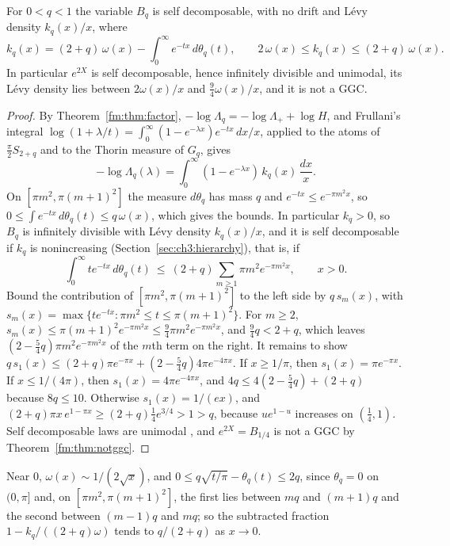 \begin{theorem}\label{fm:thm:sd}
For $0<q<1$ the variable $B_q$ is self decomposable, with no drift and L\'evy density $k_q(x)/x$, where
\[
k_q(x)=(2+q)\,\omega(x)-\int_0^\infty e^{-tx}\,d\theta_q(t),\qquad 2\,\omega(x)\le k_q(x)\le(2+q)\,\omega(x).
\]
In particular $e^{2X}$ is self decomposable, hence infinitely divisible and unimodal, its L\'evy density lies between $2\omega(x)/x$ and $\frac94\omega(x)/x$, and it is not a GGC.
\end{theorem}

\begin{proof}
By Theorem~\ref{fm:thm:factor}, $-\log\Lambda_q=-\log\Lambda_++\log H$, and Frullani's integral $\log(1+\lambda/t)=\int_0^\infty(1-e^{-\lambda x})e^{-tx}\,dx/x$, applied to the atoms of $\frac\pi2S_{2+q}$ and to the Thorin measure of $G_q$, gives
\[
-\log\Lambda_q(\lambda)=\int_0^\infty(1-e^{-\lambda x})\,k_q(x)\,\frac{dx}x .
\]
On $[\pi m^2,\pi(m+1)^2]$ the measure $d\theta_q$ has mass $q$ and $e^{-tx}\le e^{-\pi m^2x}$, so $0\le\int e^{-tx}\,d\theta_q(t)\le q\,\omega(x)$, which gives the bounds. In particular $k_q>0$, so $B_q$ is infinitely divisible with L\'evy density $k_q(x)/x$, and it is self decomposable if $k_q$ is nonincreasing (Section~\ref{sec:ch3:hierarchy}), that is, if
\[
\int_0^\infty te^{-tx}\,d\theta_q(t)\ \le\ (2+q)\sum_{m\ge1}\pi m^2e^{-\pi m^2x},\qquad x>0 .
\]
Bound the contribution of $[\pi m^2,\pi(m+1)^2]$ to the left side by $q\,s_m(x)$, with $s_m(x)=\max\{te^{-tx}:\pi m^2\le t\le\pi(m+1)^2\}$. For $m\ge2$, $s_m(x)\le\pi(m+1)^2e^{-\pi m^2x}\le\frac94\pi m^2e^{-\pi m^2x}$, and $\frac94q<2+q$, which leaves $(2-\frac54q)\pi m^2e^{-\pi m^2x}$ of the $m$th term on the right. It remains to show $q\,s_1(x)\le(2+q)\pi e^{-\pi x}+(2-\frac54q)4\pi e^{-4\pi x}$. If $x\ge1/\pi$, then $s_1(x)=\pi e^{-\pi x}$. If $x\le1/(4\pi)$, then $s_1(x)=4\pi e^{-4\pi x}$, and $4q\le4(2-\frac54q)+(2+q)$ because $8q\le10$. Otherwise $s_1(x)=1/(ex)$, and $(2+q)\pi x\,e^{1-\pi x}\ge(2+q)\frac14e^{3/4}>1>q$, because $ue^{1-u}$ increases on $(\frac14,1)$. Self decomposable laws are unimodal \cite{Yamazato78}, and $e^{2X}=B_{1/4}$ is not a GGC by Theorem~\ref{fm:thm:notggc}.
\end{proof}

Near $0$, $\omega(x)\sim1/(2\sqrt x)$, and $0\le q\sqrt{t/\pi}-\theta_q(t)\le2q$, since $\theta_q=0$ on $(0,\pi]$ and, on $[\pi m^2,\pi(m+1)^2]$, the first lies between $mq$ and $(m+1)q$ and the second between $(m-1)q$ and $mq$; so the subtracted fraction $1-k_q/((2+q)\omega)$ tends to $q/(2+q)$ as $x\to0$.

